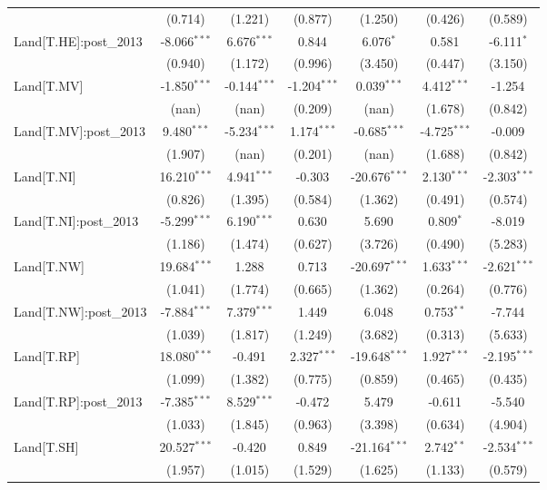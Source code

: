 \begin{table}[!htbp]
\begin{tabular}{@{\extracolsep{5pt}}lcccccc}
  & (0.714) & (1.221) & (0.877) & (1.250) & (0.426) & (0.589) \\
 Land[T.HE]:post_2013 & -8.066$^{***}$ & 6.676$^{***}$ & 0.844$^{}$ & 6.076$^{*}$ & 0.581$^{}$ & -6.111$^{*}$ \\
  & (0.940) & (1.172) & (0.996) & (3.450) & (0.447) & (3.150) \\
 Land[T.MV] & -1.850$^{***}$ & -0.144$^{***}$ & -1.204$^{***}$ & 0.039$^{***}$ & 4.412$^{***}$ & -1.254$^{}$ \\
  & (nan) & (nan) & (0.209) & (nan) & (1.678) & (0.842) \\
 Land[T.MV]:post_2013 & 9.480$^{***}$ & -5.234$^{***}$ & 1.174$^{***}$ & -0.685$^{***}$ & -4.725$^{***}$ & -0.009$^{}$ \\
  & (1.907) & (nan) & (0.201) & (nan) & (1.688) & (0.842) \\
 Land[T.NI] & 16.210$^{***}$ & 4.941$^{***}$ & -0.303$^{}$ & -20.676$^{***}$ & 2.130$^{***}$ & -2.303$^{***}$ \\
  & (0.826) & (1.395) & (0.584) & (1.362) & (0.491) & (0.574) \\
 Land[T.NI]:post_2013 & -5.299$^{***}$ & 6.190$^{***}$ & 0.630$^{}$ & 5.690$^{}$ & 0.809$^{*}$ & -8.019$^{}$ \\
  & (1.186) & (1.474) & (0.627) & (3.726) & (0.490) & (5.283) \\
 Land[T.NW] & 19.684$^{***}$ & 1.288$^{}$ & 0.713$^{}$ & -20.697$^{***}$ & 1.633$^{***}$ & -2.621$^{***}$ \\
  & (1.041) & (1.774) & (0.665) & (1.362) & (0.264) & (0.776) \\
 Land[T.NW]:post_2013 & -7.884$^{***}$ & 7.379$^{***}$ & 1.449$^{}$ & 6.048$^{}$ & 0.753$^{**}$ & -7.744$^{}$ \\
  & (1.039) & (1.817) & (1.249) & (3.682) & (0.313) & (5.633) \\
 Land[T.RP] & 18.080$^{***}$ & -0.491$^{}$ & 2.327$^{***}$ & -19.648$^{***}$ & 1.927$^{***}$ & -2.195$^{***}$ \\
  & (1.099) & (1.382) & (0.775) & (0.859) & (0.465) & (0.435) \\
 Land[T.RP]:post_2013 & -7.385$^{***}$ & 8.529$^{***}$ & -0.472$^{}$ & 5.479$^{}$ & -0.611$^{}$ & -5.540$^{}$ \\
  & (1.033) & (1.845) & (0.963) & (3.398) & (0.634) & (4.904) \\
 Land[T.SH] & 20.527$^{***}$ & -0.420$^{}$ & 0.849$^{}$ & -21.164$^{***}$ & 2.742$^{**}$ & -2.534$^{***}$ \\
  & (1.957) & (1.015) & (1.529) & (1.625) & (1.133) & (0.579) \\

\end{tabular}
\end{table}
